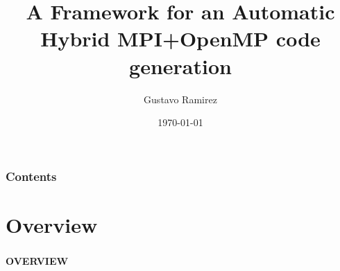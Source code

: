 \documentclass{beamer}
\title[Auto Hybrid Generator]{A Framework for an Automatic Hybrid MPI+OpenMP code generation} %
\author{Gustavo Ramirez} %
\date{\today} %
\begin{document}
\begin{frame}
\titlepage %
\end{frame}

\begin{frame}
\frametitle{Contents} %
\tableofcontents %
\end{frame}




\section{Overview}

\begin{frame}
\frametitle{}

\begin{center}
\textbf{OVERVIEW}
\end{center}

\end{frame}
\end{document}
